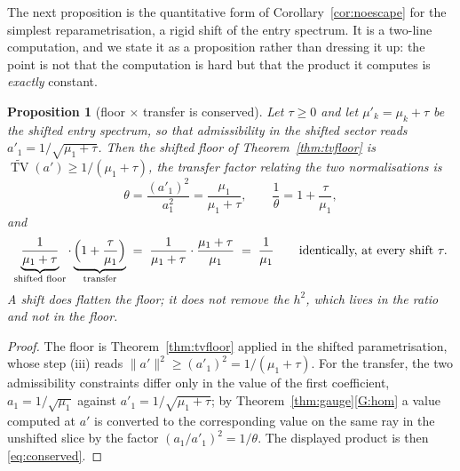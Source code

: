 \documentclass[11pt,a4paper]{article}
\theoremstyle{plain}
\newtheorem{proposition}[theorem]{Proposition}
\theoremstyle{definition}
\newcommand{\TV}{\operatorname{TV}}
\begin{document}
The next proposition is the quantitative form of Corollary~\ref{cor:noescape}
for the simplest reparametrisation, a rigid shift of the entry spectrum. It is a
two-line computation, and we state it as a proposition rather than dressing it
up: the point is not that the computation is hard but that the product it
computes is \emph{exactly} constant.

\begin{proposition}[floor $\times$ transfer is conserved]
\label{prop:shift}
Let $\tau\ge0$ and let $\mu'_k=\mu_k+\tau$ be the shifted entry spectrum, so
that admissibility in the shifted sector reads $a'_1=1/\sqrt{\mu_1+\tau}$. Then
the shifted floor of Theorem~\ref{thm:tvfloor} is
$\widetilde{\TV}(a')\ge1/(\mu_1+\tau)$, the transfer factor relating the two
normalisations is
\begin{equation}
\label{eq:transfer}
  \theta=\frac{(a'_1)^{2}}{a_1^{2}}=\frac{\mu_1}{\mu_1+\tau},
  \qquad
  \frac1\theta=1+\frac\tau{\mu_1},
\end{equation}
and
\begin{equation}
\label{eq:conserved}
  \underbrace{\frac1{\mu_1+\tau}}_{\text{shifted floor}}\cdot
  \underbrace{\Bigl(1+\frac\tau{\mu_1}\Bigr)}_{\text{transfer}}
  \;=\;\frac1{\mu_1+\tau}\cdot\frac{\mu_1+\tau}{\mu_1}
  \;=\;\frac1{\mu_1}
  \qquad\text{identically, at every shift }\tau .
\end{equation}
A shift does flatten the floor; it does not remove the $h^{2}$, which lives in
the ratio and not in the floor.
\end{proposition}

\begin{proof}
The floor is Theorem~\ref{thm:tvfloor} applied in the shifted parametrisation,
whose step (iii) reads $\lVert a'\rVert^{2}\ge(a'_1)^{2}=1/(\mu_1+\tau)$.
For the transfer, the two admissibility constraints differ only in the value of
the first coefficient, $a_1=1/\sqrt{\mu_1}$ against
$a'_1=1/\sqrt{\mu_1+\tau}$; by Theorem~\ref{thm:gauge}\ref{G:hom} a value
computed at $a'$ is converted to the corresponding value on the same ray in the
unshifted slice by the factor $(a_1/a'_1)^{2}=1/\theta$. The displayed product
is then \eqref{eq:conserved}.
\end{proof}
\end{document}
